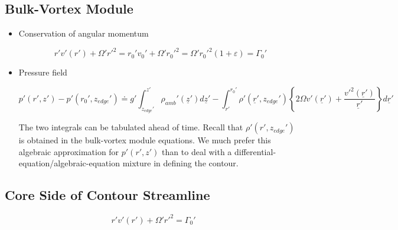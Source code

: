 \documentclass{article}
\begin{document}
\subsection{Bulk-Vortex Module}

\begin{itemize}
\item Conservation of angular momentum

\begin{equation}
	r'v'(r') + \Omega' r'^2 = r_0' v_0' + \Omega'r_0'^2 = \Omega' r_0'^2(1+\varepsilon) = \Gamma_0'
\end{equation}

\item Pressure field

\begin{equation}
	p'(r',z') - p'(r_0',z_{edge}') \doteq g' \int_{z_{edge}'}^{z'} \rho_{amb}'( \underline{z}') d \underline{z}' - \int_{r'}^{r_0'} \rho'(\underline{r}', z_{edge}')\left \{ 2 \Omega v'(\underline{r}') + \frac{v'^2(\underline{r}')}{\underline{r}'} \right \} d\underline{r}'
\end{equation}

The two integrals can be tabulated ahead of time. Recall that $\rho'(r',z_{edge}')$ is obtained in the bulk-vortex module equations. We much prefer this algebraic approximation for $p'(r',z')$ than to deal with a differential-equation/algebraic-equation mixture in defining the contour.

\end{itemize} 

\subsection{Core Side of Contour Streamline}
\begin{equation}
	r'v'(r') + \Omega' r'^2 = \Gamma_0'
\end{equation}
\end{document}
